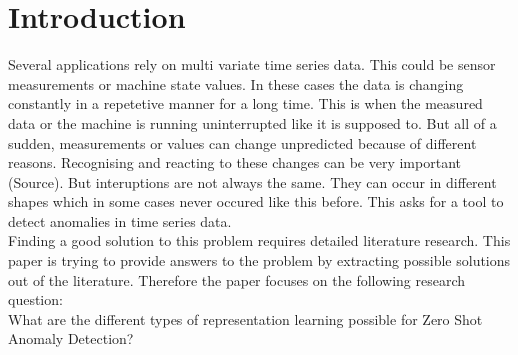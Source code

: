 \chapter{Introduction}\label{intro}
Several applications rely on multi variate time series data. This could be sensor measurements or machine state values. In these cases the data is changing constantly in a repetetive manner for a long time. This is when the measured data or the machine is running uninterrupted like it is supposed to. But all of a sudden, measurements or values can change unpredicted because of different reasons. Recognising and reacting to these changes can be very important (Source). But interuptions are not always the same. They can occur in different shapes which in some cases never occured like this before. This asks for a tool to detect anomalies in time series data.\\
Finding a good solution to this problem requires detailed literature research. This paper is trying to provide answers to the problem by extracting possible solutions out of the literature. Therefore the paper focuses on the following research question:\\
What are the different types of representation learning possible for Zero Shot Anomaly Detection?